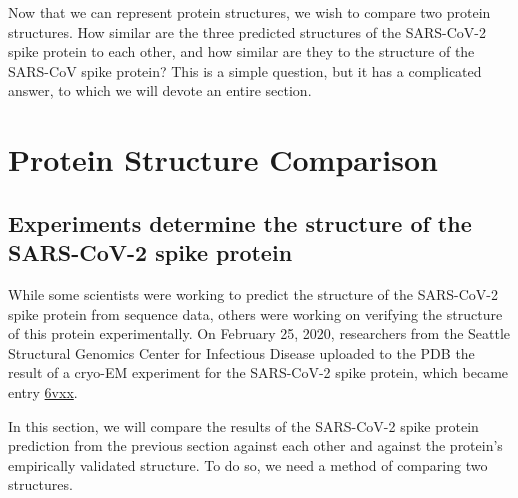 \begin{note}\end{note}

Now that we can represent protein structures, we wish to compare two protein structures. How similar are the three predicted structures of the SARS-CoV-2 spike protein to each other, and how similar are they to the structure of the SARS-CoV spike protein? This is a simple question, but it has a complicated answer, to which we will devote an entire section.\\

\FloatBarrier
{}

\section{Protein Structure Comparison}
\label{sec:accuracy}
\subsection{Experiments determine the structure of the SARS-CoV-2 spike protein}

While some scientists were working to predict the structure of the SARS-CoV-2 spike protein from sequence data, others were working on verifying the structure of this protein experimentally. On February 25, 2020, researchers from the Seattle Structural Genomics Center for Infectious Disease uploaded to the PDB the result of a cryo-EM experiment for the SARS-CoV-2 spike protein, which became entry \href{http://www.rcsb.org/structure/6VXX}{6vxx}.\\

\begin{note}\end{note}

In this section, we will compare the results of the SARS-CoV-2 spike protein prediction from the previous section against each other and against the protein's empirically validated structure. To do so, we need a method of comparing two structures.

